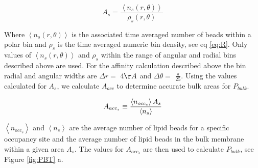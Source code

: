 \begin{equation}
    A_s = \frac{\left\langle n_s(r,\theta) \right\rangle}{\rho_s(r,\theta)}
\label{eq:A}
\end{equation}

Where $\left\langle n_s(r,\theta) \right\rangle$ is the associated time averaged number of beads within a polar bin and $\rho_s$ is the time averaged numeric bin density, see eq \ref{eq:R}. Only values of $\left\langle n_s(r,\theta) \right\rangle$ and  $\rho_s$ within the range of angular and radial bins described above are used. For the affinity calculation described above the bin radial and angular widths are $\Delta r=$  4$\AA$ and $\Delta \theta=$ $\frac{\pi}{25}$. Using the values calculated for $A_s$, we calculate $A_{acc}$ to determine accurate bulk areas for $P_{bulk}$.

\begin{equation}
	A_{acc_s} \equiv \frac{\left\langle n_{occ_s} \right\rangle A_s }{\left\langle n_s \right\rangle} \label{eq:aac}\\
\end{equation}

$\left\langle n_{occ_s}\right\rangle$ and $\left\langle n_s  \right\rangle$ are the average number of lipid beads for a specific occupancy site and the average number of lipid beads in the bulk membrane within a given area $A_s$. The values for $A_{acc_s}$ are then used to calculate $P_{bulk}$, see Figure \ref{fig:PBT} a.

